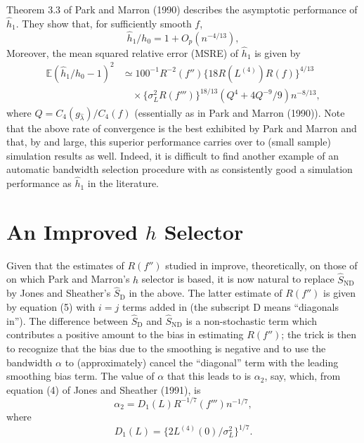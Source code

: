 \documentclass[11pt]{article}
\newcommand{\SND}{\widehat S_{\mathrm{ND}}}
\newcommand{\SD}{\widehat S_{\mathrm{D}}}
\begin{document}
Theorem 3.3 of Park and Marron (1990) describes the asymptotic performance of $\widehat h_1$. They show that, for sufficiently smooth $f$,
\begin{equation}
\widehat h_1/h_0=1+O_p(n^{-4/13}),
\tag{7}
\end{equation}
Moreover, the mean squared relative error (MSRE) of $\widehat h_1$ is given by
\begin{equation}
\begin{split}
\mathbb E(\widehat h_1/h_0-1)^2
&\simeq100^{-1}R^{-2}(f'')\{18R(L^{(4)})R(f)\}^{4/13}\\
&\quad\times\{\sigma_L^2R(f''')\}^{18/13}(Q^4+4Q^{-9}/9)n^{-8/13},
\end{split}
\tag{8}
\end{equation}
where $Q=C_4(g_{\widehat\lambda})/C_4(f)$ (essentially as in Park and Marron (1990)). Note that the above rate of convergence is the best exhibited by Park and Marron and that, by and large, this superior performance carries over to (small sample) simulation results as well. Indeed, it is difficult to find another example of an automatic bandwidth selection procedure with as consistently good a simulation performance as $\widehat h_1$ in the literature.

\section{An Improved $h$ Selector}
Given that the estimates of $R(f'')$ studied in \citet{jones_sheather1991} improve, theoretically, on those of \citet{hallmarron1987} on which Park and Marron's $h$ selector is based, it is now natural to replace $\SND$ by Jones and Sheather's $\SD$ in the above. The latter estimate of $R(f'')$ is given by equation (5) with $i=j$ terms added in (the subscript D means ``diagonals in''). The difference between $\SD$ and $\SND$ is a non-stochastic term which contributes a positive amount to the bias in estimating $R(f'')$; the trick is then to recognize that the bias due to the smoothing is negative and to use the bandwidth $\alpha$ to (approximately) cancel the ``diagonal'' term with the leading smoothing bias term. The value of $\alpha$ that this leads to is $\alpha_2$, say, which, from equation (4) of Jones and Sheather (1991), is
\begin{equation}
\alpha_2=D_1(L)R^{-1/7}(f''')n^{-1/7},
\tag{9}
\end{equation}
where
\begin{equation}
D_1(L)=\{2L^{(4)}(0)/\sigma_L^2\}^{1/7}.
\end{equation}
\end{document}
